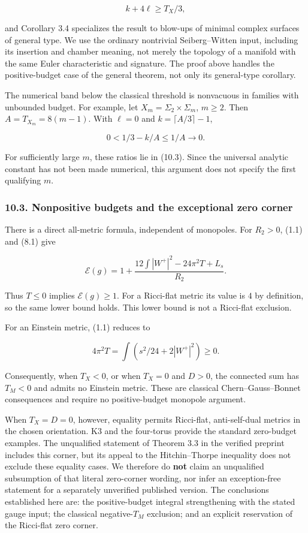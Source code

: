 \documentclass[
  10pt,
]{article}
\begin{document}
\[
                              k+4\ell\ge T_X/3,
\]

and Corollary 3.4 specializes the result to blow-ups of minimal complex
surfaces of general type. We use the ordinary nontrivial Seiberg--Witten
input, including its insertion and chamber meaning, not merely the
topology of a manifold with the same Euler characteristic and signature.
The proof above handles the positive-budget case of the general theorem,
not only its general-type corollary.

The numerical band below the classical threshold is nonvacuous in
families with unbounded budget. For example, let
\(X_m=\Sigma_2\times\Sigma_m\), \(m\ge2\). Then \(A=T_{X_m}=8(m-1)\).
With \(\ell=0\) and \(k=\lceil A/3\rceil-1\),

\[
                       0<1/3-k/A\le1/A\longrightarrow0.
\]

For sufficiently large \(m\), these ratios lie in (10.3). Since the
universal analytic constant has not been made numerical, this argument
does not specify the first qualifying \(m\).

\hypertarget{nonpositive-budgets-and-the-exceptional-zero-corner}{%
\subsubsection{10.3. Nonpositive budgets and the exceptional zero
corner}\label{nonpositive-budgets-and-the-exceptional-zero-corner}}

There is a direct all-metric formula, independent of monopoles. For
\(R_2>0\), (1.1) and (8.1) give

\[
 \mathcal E(g)
   =1+\frac{12\int|W^+|^2-24\pi^2T+L_s}{R_2}.           \tag{10.5}
\]

Thus \(T\le0\) implies \(\mathcal E(g)\ge1\). For a Ricci-flat metric
its value is \(4\) by definition, so the same lower bound holds. This
lower bound is not a Ricci-flat exclusion.

For an Einstein metric, (1.1) reduces to

\[
               4\pi^2T=\int(s^2/24+2|W^+|^2)\ge0.
\]

Consequently, when \(T_X<0\), or when \(T_X=0\) and \(D>0\), the
connected sum has \(T_M<0\) and admits no Einstein metric. These are
classical Chern--Gauss--Bonnet consequences and require no
positive-budget monopole argument.

When \(T_X=D=0\), however, equality permits Ricci-flat, anti-self-dual
metrics in the chosen orientation. K3 and the four-torus provide the
standard zero-budget examples. The unqualified statement of Theorem 3.3
in the verified preprint includes this corner, but its appeal to the
Hitchin--Thorpe inequality does not exclude these equality cases. We
therefore do \textbf{not} claim an unqualified subsumption of that
literal zero-corner wording, nor infer an exception-free statement for a
separately unverified published version. The conclusions established
here are: the positive-budget integral strengthening with the stated
gauge input; the classical negative-\(T_M\) exclusion; and an explicit
reservation of the Ricci-flat zero corner.
\end{document}
